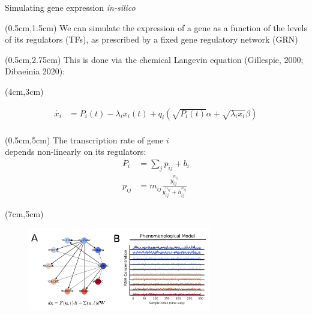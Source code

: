 \documentclass[aspectratio=1610]{beamer}					%
\begin{document}
\begin{frame}{Simulating gene expression \emph{in-silico}}

\begin{textblock*}{15cm}(0.5cm,1.5cm)
We can simulate the expression of a gene as a function of the levels of its regulators (TFs), as prescribed by a
fixed gene regulatory network (GRN) 
\end{textblock*}

\begin{textblock*}{15cm}(0.5cm,2.75cm)
This is done via the chemical Langevin equation (Gillespie, 2000; Dibaeinia 2020):
\end{textblock*}

\begin{textblock*}{7cm}(4cm,3cm)
\begin{figure}
\begin{align*}
\dot{x_{i}} &= P_{i}(t) -\lambda_{i}x_{i}(t) + q_{i}\left(\sqrt{P_{i}(t)}\alpha + \sqrt{\lambda_{i}x_{i}}\beta\right)  \\
\end{align*}
\end{figure}
\end{textblock*}

\begin{textblock*}{7cm}(0.5cm,5cm)
The transcription rate of gene $i$\\
depends non-linearly on its regulators:
\begin{align*}
P_{i} &= \sum_{j}p_{ij} + b_{i}\\
p_{ij} &= m_{ij}\frac{y_{ij}^{n_{ij}}}{y_{ij}^{n_{ij}}+h_{ij}^{n_{ij}}}
\end{align*}
\end{textblock*}

\begin{textblock*}{8cm}(7cm,5cm)
\begin{figure}
\includegraphics[width=8cm]{logic-ab.png}
\end{figure}
\end{textblock*}


\end{frame}
\end{document}
